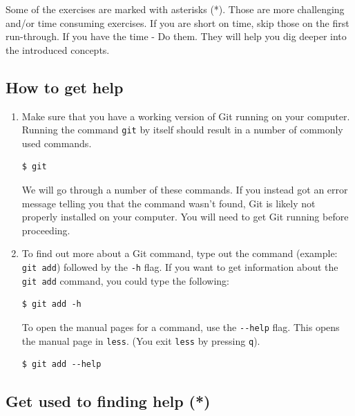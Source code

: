 \documentclass[../main/git_course_main.tex]{subfiles}
\begin{document}
Some of the exercises are marked with asterisks (*). Those are more challenging and/or time consuming exercises. If you are short on time, skip those on the first run-through. If you have the time - Do them. They will help you dig deeper into the introduced concepts.

\subsection{How to get help}

\begin{enumerate}
\item Make sure that you have a working version of Git running on your computer. Running the command \verb$git$ by itself should result in a number
of commonly used commands.

\begin{codebox}
\begin{lstlisting}
$ git
\end{lstlisting}
\end{codebox}

We will go through a number of these commands.
If you instead got an error message telling you that the command wasn't found, Git is likely not properly installed on your computer.
You will need to get Git running before proceeding.

\item To find out more about a Git command, type out the command (example: \verb$git add$) followed by the \verb$-h$ flag. 
If you want to get information about the \verb$git add$ command, you could type the following:

\begin{codebox}
\begin{lstlisting}
$ git add -h
\end{lstlisting}
\end{codebox}

To open the manual pages for a command, use the \verb$--help$ flag. This opens the manual page in \verb$less$.
(You exit \verb$less$ by pressing \verb$q$).

\begin{codebox}
\begin{lstlisting}
$ git add --help
\end{lstlisting}
\end{codebox}

\end{enumerate}

\subsection{Get used to finding help (*)}
\end{document}
